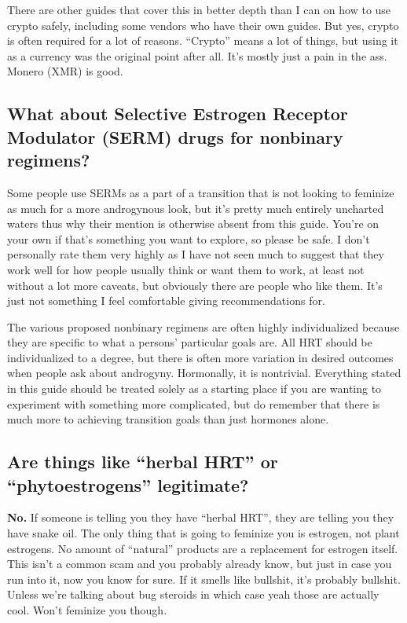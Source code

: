 \documentclass{article}
\begin{document}
{{There are other guides that cover this in better depth than I can on how to use crypto safely, including some vendors who have their own guides. But yes, crypto is often required for a lot of reasons. “Crypto” means a lot of things, but using it as a currency was the original point after all. It’s mostly just a pain in the ass. Monero (XMR) is good.

\subsection{What about Selective Estrogen Receptor Modulator (SERM) drugs for nonbinary regimens?}

Some people use SERMs as a part of a transition that is not looking to feminize as much for a more androgynous look, but it’s pretty much entirely uncharted waters thus why their mention is otherwise absent from this guide. You’re on your own if that’s something you want to explore, so please be safe. I don’t personally rate them very highly as I have not seen much to suggest that they work well for how people usually think or want them to work, at least not without a lot more caveats, but obviously there are people who like them. It's just not something I feel comfortable giving recommendations for.

The various proposed nonbinary regimens are often highly individualized because they are specific to what a persons' particular goals are. All HRT should be individualized to a degree, but there is often more variation in desired outcomes when people ask about androgyny. Hormonally, it is nontrivial. Everything stated in this guide should be treated solely as a starting place if you are wanting to experiment with something more complicated, but do remember that there is much more to achieving transition goals than just hormones alone.

\subsection{Are things like “herbal HRT” or “phytoestrogens” legitimate?}

\textbf{No.} If someone is telling you they have “herbal HRT”, they are telling you they have snake oil. The only thing that is going to feminize you is estrogen, not plant estrogens. No amount of “natural” products are a replacement for estrogen itself. This isn’t a common scam and you probably already know, but just in case you run into it, now you know for sure. If it smells like bullshit, it’s probably bullshit. Unless we’re talking about bug steroids in which case yeah those are actually cool. Won’t feminize you though.

}}
\end{document}
